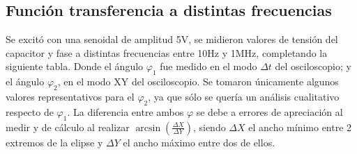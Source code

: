 \subsection{Función transferencia a distintas frecuencias}

Se excitó con una senoidal de amplitud 5V, se midieron valores de tensión del capacitor y fase a distintas frecuencias entre 10Hz y 1MHz, completando la siguiente tabla. Donde el ángulo $\varphi_1$ fue medido en el modo $\Delta t$ del osciloscopio; y el ángulo $\varphi_2$, en el modo XY del osciloscopio.
Se tomaron únicamente algunos valores representativos para el $\varphi_2$, ya que sólo se quería un análisis cualitativo respecto de $\varphi_1$.
La diferencia entre ambos $\varphi$ se debe a errores de apreciación al medir y de cálculo al realizar $\arcsin(\frac{\Delta X}{\Delta Y})$, siendo $\Delta X$ el ancho mínimo entre 2 extremos de la elipse y $\Delta Y$ el ancho máximo entre dos de ellos. 


